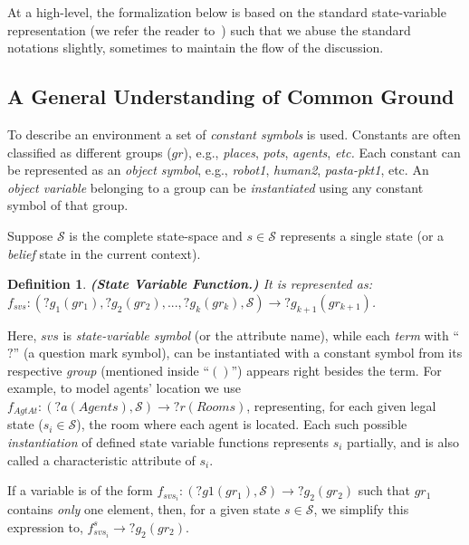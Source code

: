 \documentclass[letterpaper]{article} %
\newtheorem{definition}{Definition}
\begin{document}
At a high-level, the formalization below is based on the standard state-variable representation (we refer the reader to~\cite{naubooks0014222}) such that we abuse the standard notations slightly, sometimes to maintain the flow of the discussion.

\subsection{A General Understanding of Common Ground}
To describe an environment a set of \textit{constant symbols} is used. 
Constants are often classified as different groups ($gr$), e.g., \textit{places}, \textit{pots}, \textit{agents}, \textit{etc.} 
Each constant can be represented as an \textit{object symbol}, e.g., \textit{robot1}, \textit{human2}, \textit{pasta-pkt1}, etc. 
An \textit{object variable} belonging to a group can be \textit{instantiated} using any constant symbol of that group.

Suppose $\mathcal{S}$ is the complete state-space and $s \in \mathcal{S}$ represents a single state (or a \textit{belief} state in the current context).  


\begin{definition}
\textbf{(State Variable Function.)} It is represented as: $f_{svs}:(?g_1 (gr_1), ?g_2 (gr_2), ..., ?g_k (gr_k),\mathcal{S})\rightarrow ?g_{k+1} (gr_{k+1})$. 
\end{definition}
Here, $svs$ is \textit{state-variable symbol} (or the attribute name), while each \textit{term} with ``$?$'' (a question mark symbol), can be instantiated with a constant symbol from its respective \textit{group} (mentioned inside ``$()$'') appears right besides the term. 
For example, to model agents' location we use $f_{\textit{AgtAt}}:(?a (Agents), \mathcal{S}) \rightarrow ?r (Rooms)$, representing, for each given legal state ($s_i \in \mathcal{S}$), the room where each agent is located. 
Each such possible \textit{instantiation} of defined state variable functions represents $s_i$ partially, and is also called a characteristic attribute of $s_i$.     

If a variable is of the form $f_{svs_i}: (?g1 (gr_1), \mathcal{S}) \rightarrow ?g_2 (gr_2)$ such that $gr_1$ contains \textit{only} one element, then, for a given state $s \in \mathcal{S}$, we simplify this expression to, $f_{svs_i}^{s} \rightarrow ?g_2 (gr_2)$. 
\end{document}
